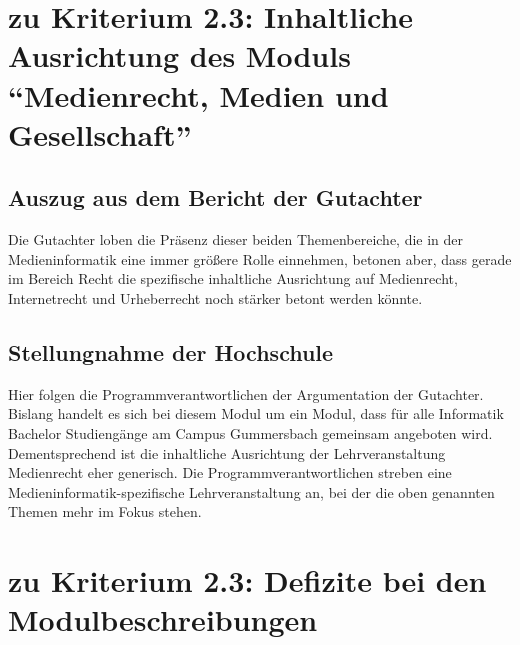 \section{\texorpdfstring{zu Kriterium 2.3: Inhaltliche Ausrichtung
des Moduls ``Medienrecht, Medien und
Gesellschaft''\label{/mi-2017/selbstbericht/stellungnahme/0000-stellungnahme}}{zu Kriterium 2.3: Inhaltliche Ausrichtung des Moduls Medienrecht, Medien und Gesellschaft\label{/mi-2017/selbstbericht/stellungnahme/0000-stellungnahme}}}\label{zu-kriterium-2.3-inhaltliche-ausrichtung-des-moduls-medienrecht-medien-und-gesellschaftpathlabelmi-2017selbstberichtstellungnahme0000-stellungnahme}

\subsection{Auszug aus dem Bericht der
Gutachter\label{/mi-2017/selbstbericht/stellungnahme/0000-stellungnahme}}\label{auszug-aus-dem-bericht-der-gutachterpathlabelmi-2017selbstberichtstellungnahme0000-stellungnahme-2}

\begin{siderules}
Die Gutachter loben die Präsenz dieser beiden Themenbereiche, die in der
Medieninformatik eine immer größere Rolle einnehmen, betonen aber, dass
gerade im Bereich Recht die spezifische inhaltliche Ausrichtung auf
Medienrecht, Internetrecht und Urheberrecht noch stärker betont werden
könnte.
\end{siderules}

\subsection{Stellungnahme der
Hochschule\label{/mi-2017/selbstbericht/stellungnahme/0000-stellungnahme}}\label{stellungnahme-der-hochschulepathlabelmi-2017selbstberichtstellungnahme0000-stellungnahme-1}

Hier folgen die Programmverantwortlichen der Argumentation der
Gutachter. Bislang handelt es sich bei diesem Modul um ein Modul, dass
für alle Informatik Bachelor Studiengänge am Campus Gummersbach
gemeinsam angeboten wird. Dementsprechend ist die inhaltliche
Ausrichtung der Lehrveranstaltung Medienrecht eher generisch. Die
Programmverantwortlichen streben eine Medieninformatik-spezifische
Lehrveranstaltung an, bei der die oben genannten Themen mehr im Fokus
stehen.

\section{zu Kriterium 2.3: Defizite bei den
Modulbeschreibungen\label{/mi-2017/selbstbericht/stellungnahme/0000-stellungnahme}}\label{zu-kriterium-2.3-defizite-bei-den-modulbeschreibungenpathlabelmi-2017selbstberichtstellungnahme0000-stellungnahme}

